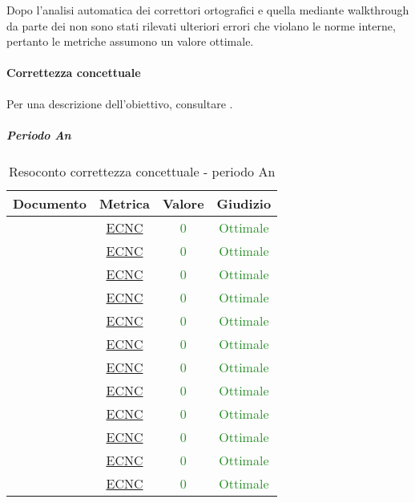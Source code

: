 						Dopo l'analisi automatica dei correttori ortografici e quella mediante walkthrough da parte dei \verificatori{} non sono stati rilevati ulteriori errori che violano le norme interne, pertanto le metriche assumono un valore ottimale.
						
						\newpage
				\paragraph{Correttezza concettuale}
					Per una descrizione dell'obiettivo, consultare .
					\subparagraph{Periodo An}
				
						\begin{table}[H]
							\centering
							\small
							\begin{tabular}{c | c | c | c}
								\hline
								\textbf{Documento} & \textbf{Metrica} & \textbf{Valore} & \textbf{Giudizio} \\
								\hline
								\pdpvuno & \hyperref[MCC]{ECNC} & \textcolor{ForestGreen}{0} & \textcolor{ForestGreen}{Ottimale} \\
								\pdqvuno & \hyperref[MCC]{ECNC} & \textcolor{ForestGreen}{0} & \textcolor{ForestGreen}{Ottimale}\\
								\ndpvuno & \hyperref[MCC]{ECNC} &\textcolor{ForestGreen}{0} & \textcolor{ForestGreen}{Ottimale}\\
								\sdfv & \hyperref[MCC]{ECNC} & \textcolor{ForestGreen}{0} & \textcolor{ForestGreen}{Ottimale}\\
								\adrvuno & \hyperref[MCC]{ECNC} & \textcolor{ForestGreen}{0} & \textcolor{ForestGreen}{Ottimale}\\
								\glvuno  & \hyperref[MCC]{ECNC} & \textcolor{ForestGreen}{0} & \textcolor{ForestGreen}{Ottimale}\\
								\vunoi& \hyperref[MCC]{ECNC} & \textcolor{ForestGreen}{0} & \textcolor{ForestGreen}{Ottimale}\\
								\vduei& \hyperref[MCC]{ECNC} & \textcolor{ForestGreen}{0} & \textcolor{ForestGreen}{Ottimale}\\
								\vtrei & \hyperref[MCC]{ECNC} & \textcolor{ForestGreen}{0} & \textcolor{ForestGreen}{Ottimale}\\
								\vquattroi & \hyperref[MCC]{ECNC} & \textcolor{ForestGreen}{0} & \textcolor{ForestGreen}{Ottimale}\\
								\vunoe & \hyperref[MCC]{ECNC} & \textcolor{ForestGreen}{0} & \textcolor{ForestGreen}{Ottimale}\\
								\vduee & \hyperref[MCC]{ECNC} & \textcolor{ForestGreen}{0} & \textcolor{ForestGreen}{Ottimale}\\
								\hline
							\end{tabular}
							\caption{Resoconto correttezza concettuale - periodo An}
							\label{tab_resoconto_correttezza_concettuale_PA}
						\end{table}

